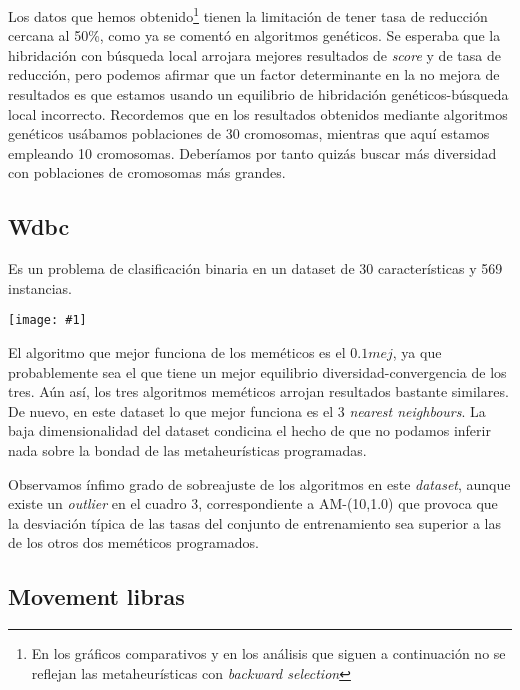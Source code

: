 \documentclass[a4paper,11pt]{article}
\newcommand{\imagen}[4]{
  \begin{minipage}{\linewidth}
    \centering
    \texttt{[image: \#1]}
    \captionof{figure}{#2}
    \label{#3}
  \end{minipage} 
}
\newcommand{\imgn}[3]{
  \begin{minipage}{\linewidth}
    \centering
    \texttt{[image: \#1]}
    \captionof{figure}{#2}
  \end{minipage} 
}
\begin{document}
  Los datos que hemos obtenido\footnote{En los gráficos comparativos y en los análisis que siguen a continuación
  no se reflejan las metaheurísticas con \textit{backward selection}}
  tienen la limitación de tener tasa de reducción cercana al 50\%, como ya se comentó en algoritmos
  genéticos. Se esperaba que la hibridación con búsqueda local arrojara mejores resultados de \textit{score} y de tasa de reducción,
  pero podemos afirmar que un factor determinante en la no mejora de resultados es que estamos usando un equilibrio de hibridación
  genéticos-búsqueda local incorrecto. Recordemos que en los resultados obtenidos mediante algoritmos genéticos usábamos 
  poblaciones de 30 cromosomas, mientras que aquí estamos empleando 10 cromosomas. Deberíamos por tanto quizás buscar más
  diversidad con poblaciones de cromosomas más grandes.
  
 
  \subsection{Wdbc}
  
  Es un problema de clasificación binaria en un dataset de 30 características y 569 instancias.
  
  \imagen{../data/memetic/wdbc.png}{Tasas de clasificación en Wdbc}{wdbcgraph}{0.7}
  
  
  El algoritmo que mejor funciona de los meméticos es el $0.1mej$, ya que probablemente sea el que tiene un mejor equilibrio
  diversidad-convergencia de los tres. Aún así, los tres algoritmos meméticos arrojan resultados bastante similares. De nuevo,
  en este dataset lo que mejor funciona es el 3 \textit{nearest neighbours}. La baja dimensionalidad del dataset condicina el
  hecho de que no podamos inferir nada sobre la bondad de las metaheurísticas programadas.
  
  Observamos ínfimo grado de sobreajuste de los algoritmos en este \textit{dataset}, aunque existe un \textit{outlier} en el cuadro
  3, correspondiente a AM-(10,1.0) que provoca que la desviación típica de las tasas del conjunto de entrenamiento sea superior a 
  las de los otros dos meméticos programados.
  
 
  \subsection{Movement libras}
  
\end{document}
